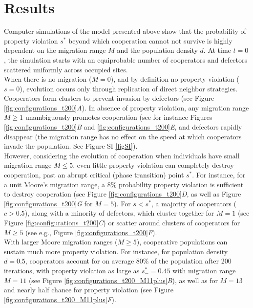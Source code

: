 \section*{Results}
Computer simulations of the model presented above show that the probability of property violation $s^{*}$ beyond which cooperation cannot not survive is highly dependent on the migration range $M$ and the population density $d$. At time $t=0$, the simulation starts with an equiprobable number of cooperators and defectors scattered uniformly across occupied sites.\\ 

When there is no migration ($M=0$), and by definition no property violation ($s=0$), evolution occurs only through replication of direct neighbor strategies. Cooperators form clusters to prevent invasion by defectors (see Figure \ref{fig:configurations_t200}{\it A}). In absence of property violation, any migration range $M \geqslant 1$ unambiguously promotes cooperation (see for instance Figures \ref{fig:configurations_t200}{\it B} and \ref{fig:configurations_t200}{\it E}, and defectors rapidly disappear (the migration range has no effect on the speed at which cooperators invade the population. See Figure SI \ref{figSI}).\\

However, considering the evolution of cooperation when individuals have small migration range $M \leqslant 5$, even little property violation can completely destroy cooperation, past an abrupt critical (phase transition) point $s^{*}$. For instance, for a unit Moore's migration range, a $8\%$ probability property violation is sufficient to destroy cooperation (see Figure \ref{fig:configurations_t200}{\it D}, as well as Figure \ref{fig:configurations_t200}{\it G} for $M=5$). For $s < s^{*}$, a majority of cooperators ($c>0.5$), along with a minority of defectors, which cluster together for $M=1$ (see Figure \ref{fig:configurations_t200}{\it C}) or scatter around clusters of cooperators for $M \geqslant 5$ (see e.g., Figure \ref{fig:configurations_t200}{\it F}).\\

With larger Moore migration ranges ($M \geqslant 5$), cooperative populations can sustain much more property violation. For instance, for population density $d=0.5$, cooperators account for on average 80\% of the population after 200 iterations, with property violation as large as $s^{*}_{-} = 0.45$ with migration range $M=11$ (see Figure \ref{fig:configurations_t200_M11plus}{\it B}), as well as for $M=13$ and nearly half chance for property violation (see Figure \ref{fig:configurations_t200_M11plus}{\it F}).\\


